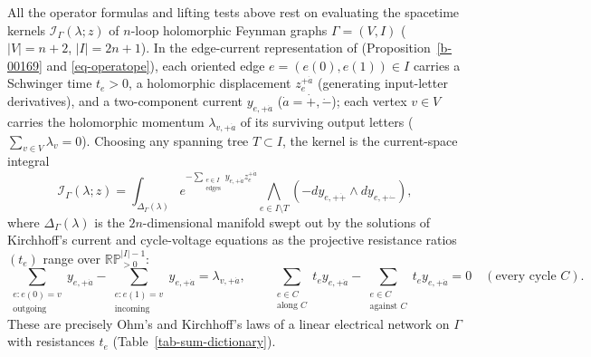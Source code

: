 \documentclass[11pt]{article}
\numberwithin{equation}{section}
\numberwithin{figure}{section}
\numberwithin{table}{section}
\begin{document}
All the operator formulas and lifting tests above rest on evaluating the spacetime kernels $\mathcal I_\Gamma(\lambda;z)$ of $n$-loop holomorphic Feynman graphs $\Gamma=(V,I)$ ($|V|=n+2$, $|I|=2n+1$). In the edge-current representation of \cite{Wang,operatope} (Proposition~\ref{b-00169} and \eqref{eq-operatope}), each oriented edge $e=(e(0),e(1))\in I$ carries a Schwinger time $t_e>0$, a holomorphic displacement $z_e^{+\dot a}$ (generating input-letter derivatives), and a two-component current $y_{e,+\dot a}$ ($\dot a=\dot+,\dot-$); each vertex $v\in V$ carries the holomorphic momentum $\lambda_{v,+\dot a}$ of its surviving output letters ($\sum_{v\in V}\lambda_v=0$). Choosing any spanning tree $T\subset I$, the kernel is the current-space integral
\begin{equation}\label{eq-sum-operatope-def}
\mathcal I_\Gamma(\lambda;z)
=\int_{\Delta_\Gamma(\lambda)}
e^{-\sum_{\substack{e\in I\\\text{edges}}}y_{e,+\dot a}z_e^{+\dot a}}
\bigwedge_{e\in I\setminus T}(-dy_{e,+\dot+}\wedge dy_{e,+\dot-}),
\end{equation}
where $\Delta_\Gamma(\lambda)$ is the $2n$-dimensional manifold swept out by the solutions of Kirchhoff's current and cycle-voltage equations as the projective resistance ratios $(t_e)$ range over $\mathbb{RP}^{|I|-1}_{>0}$:
\begin{equation}\label{eq-sum-kirchhoff-laws}
\sum_{\substack{e:e(0)=v\\\text{outgoing}}}y_{e,+\dot a}
-\sum_{\substack{e:e(1)=v\\\text{incoming}}}y_{e,+\dot a}
=\lambda_{v,+\dot a},\qquad
\sum_{\substack{e\in C\\\text{along }C}}t_ey_{e,+\dot a}
-\sum_{\substack{e\in C\\\text{against }C}}t_ey_{e,+\dot a}=0
\quad(\text{every cycle }C).
\end{equation}
These are precisely Ohm's and Kirchhoff's laws of a linear electrical network on $\Gamma$ with resistances $t_e$ (Table~\ref{tab-sum-dictionary}).
\end{document}
